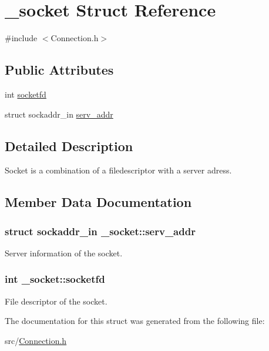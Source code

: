 \hypertarget{struct__socket}{}\section{\+\_\+socket Struct Reference}
\label{struct__socket}


{\ttfamily \#include $<$Connection.\+h$>$}

\subsection*{Public Attributes}
\begin{DoxyCompactItemize}
\item 
int \hyperlink{struct__socket_a59af0d6587e9d93fd48cd19bc22e1bec}{socketfd}
\item 
struct sockaddr\+\_\+in \hyperlink{struct__socket_a68179c318bad7971ce3dc350b89439c4}{serv\+\_\+addr}
\end{DoxyCompactItemize}


\subsection{Detailed Description}
Socket is a combination of a filedescriptor with a server adress. 

\subsection{Member Data Documentation}
\subsubsection[{\texorpdfstring{serv\+\_\+addr}{serv_addr}}]{\setlength{\rightskip}{0pt plus 5cm}struct sockaddr\+\_\+in \+\_\+socket\+::serv\+\_\+addr}\hypertarget{struct__socket_a68179c318bad7971ce3dc350b89439c4}{}\label{struct__socket_a68179c318bad7971ce3dc350b89439c4}
Server information of the socket. 
\subsubsection[{\texorpdfstring{socketfd}{socketfd}}]{\setlength{\rightskip}{0pt plus 5cm}int \+\_\+socket\+::socketfd}\hypertarget{struct__socket_a59af0d6587e9d93fd48cd19bc22e1bec}{}\label{struct__socket_a59af0d6587e9d93fd48cd19bc22e1bec}
File descriptor of the socket. 

The documentation for this struct was generated from the following file\+:\begin{DoxyCompactItemize}
\item 
src/\hyperlink{Connection_8h}{Connection.\+h}\end{DoxyCompactItemize}
